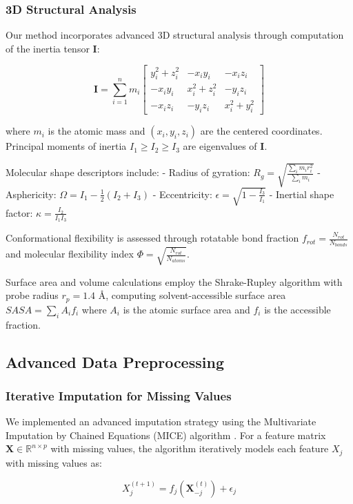 \documentclass[preprint, 10pt]{elsarticle}
\begin{document}
\subsubsection{3D Structural Analysis}
Our method incorporates advanced 3D structural analysis through computation of the inertia tensor $\mathbf{I}$:

$$\mathbf{I} = \sum_{i=1}^{n} m_i \begin{bmatrix}
y_i^2 + z_i^2 & -x_i y_i & -x_i z_i \\
-x_i y_i & x_i^2 + z_i^2 & -y_i z_i \\
-x_i z_i & -y_i z_i & x_i^2 + y_i^2
\end{bmatrix}$$

where $m_i$ is the atomic mass and $(x_i, y_i, z_i)$ are the centered coordinates. Principal moments of inertia $I_1 \geq I_2 \geq I_3$ are eigenvalues of $\mathbf{I}$.

Molecular shape descriptors include:
- Radius of gyration: $R_g = \sqrt{\frac{\sum_i m_i r_i^2}{\sum_i m_i}}$
- Asphericity: $\Omega = I_1 - \frac{1}{2}(I_2 + I_3)$
- Eccentricity: $\epsilon = \sqrt{1 - \frac{I_3}{I_1}}$
- Inertial shape factor: $\kappa = \frac{I_2}{I_1 I_3}$

Conformational flexibility is assessed through rotatable bond fraction $f_{rot} = \frac{N_{rot}}{N_{bonds}}$ and molecular flexibility index $\Phi = \sqrt{\frac{N_{rot}}{N_{atoms}}}$.

Surface area and volume calculations employ the Shrake-Rupley algorithm with probe radius $r_p = 1.4$ \AA, computing solvent-accessible surface area $SASA = \sum_i A_i f_i$ where $A_i$ is the atomic surface area and $f_i$ is the accessible fraction.

\subsection{Advanced Data Preprocessing}

\subsubsection{Iterative Imputation for Missing Values}
We implemented an advanced imputation strategy using the Multivariate Imputation by Chained Equations (MICE) algorithm \cite{pedregosa2011scikit}. For a feature matrix $\mathbf{X} \in \mathbb{R}^{n \times p}$ with missing values, the algorithm iteratively models each feature $X_j$ with missing values as:

$$X_j^{(t+1)} = f_j(\mathbf{X}_{-j}^{(t)}) + \epsilon_j$$
\end{document}

